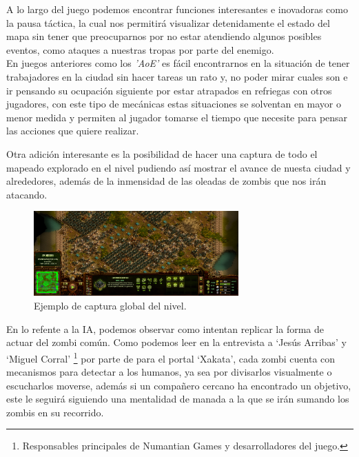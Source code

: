 A lo largo del juego podemos encontrar funciones interesantes e inovadoras como la pausa
táctica, la cual nos permitirá visualizar detenidamente el estado del mapa sin tener que
preocuparnos por no estar atendiendo algunos posibles eventos, como ataques a nuestras
tropas por parte del enemigo.\\ 
En juegos anteriores como los \textit{'\ac{AoE}'} es
fácil encontrarnos en la situación de tener trabajadores en la ciudad sin hacer tareas
un rato y, no poder mirar cuales son e ir pensando su ocupación siguiente por estar
atrapados en refriegas con otros jugadores, con este tipo de mecánicas estas situaciones
se solventan en mayor o menor medida y permiten al jugador tomarse el tiempo que
necesite para pensar las acciones que quiere realizar.

Otra adición interesante es la posibilidad de hacer una captura de todo el mapeado explorado
en el nivel pudiendo así mostrar el avance de nuesta ciudad y alrededores, además de la 
inmensidad de las oleadas de zombis que nos irán atacando.

\begin{figure}[ht]
\centering
\includegraphics[width=0.7\textwidth]{imagenes/marco_teo/referentes/tab_4.png}
\caption{Ejemplo de captura global del nivel.}
\label{img:tab_4}
\end{figure}

En lo refente a la \ac{IA}, podemos observar como intentan replicar la forma de actuar del
zombi común. Como podemos leer en la entrevista a `Jesús Arribas' y `Miguel Corral'
\footnote{Responsables principales de Numantian Games y desarrolladores del juego.} por parte
de \citeauthor*{Sucasas2018} para el portal `Xakata', cada zombi cuenta con mecanismos para 
detectar a los humanos, ya sea por divisarlos visualmente o escucharlos moverse, además si un 
compañero cercano ha encontrado un objetivo, este le seguirá siguiendo 
una mentalidad de manada a la que se irán sumando los zombis en su recorrido.

